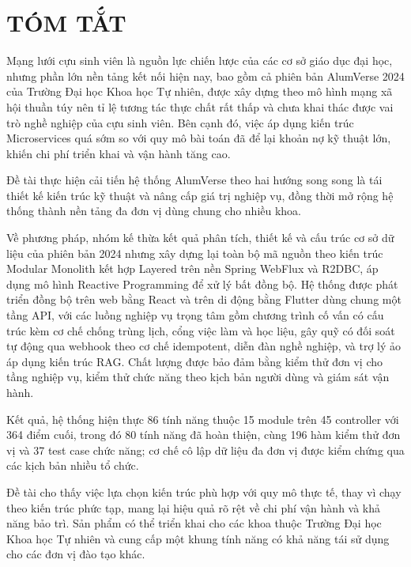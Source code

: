 \documentclass[12pt,a4paper,oneside]{report}
\begin{document}
\newpage
\chapter*{TÓM TẮT}

Mạng lưới cựu sinh viên là nguồn lực chiến lược của các cơ sở giáo dục đại học, nhưng phần lớn nền tảng kết nối hiện nay, bao gồm cả phiên bản AlumVerse 2024 của Trường Đại học Khoa học Tự nhiên, được xây dựng theo mô hình mạng xã hội thuần túy nên tỉ lệ tương tác thực chất rất thấp và chưa khai thác được vai trò nghề nghiệp của cựu sinh viên. Bên cạnh đó, việc áp dụng kiến trúc Microservices quá sớm so với quy mô bài toán đã để lại khoản nợ kỹ thuật lớn, khiến chi phí triển khai và vận hành tăng cao.

Đề tài thực hiện cải tiến hệ thống AlumVerse theo hai hướng song song là tái thiết kế kiến trúc kỹ thuật và nâng cấp giá trị nghiệp vụ, đồng thời mở rộng hệ thống thành nền tảng đa đơn vị dùng chung cho nhiều khoa.

Về phương pháp, nhóm kế thừa kết quả phân tích, thiết kế và cấu trúc cơ sở dữ liệu của phiên bản 2024 nhưng xây dựng lại toàn bộ mã nguồn theo kiến trúc Modular Monolith kết hợp Layered trên nền Spring WebFlux và R2DBC, áp dụng mô hình Reactive Programming để xử lý bất đồng bộ. Hệ thống được phát triển đồng bộ trên web bằng React và trên di động bằng Flutter dùng chung một tầng API, với các luồng nghiệp vụ trọng tâm gồm chương trình cố vấn có cấu trúc kèm cơ chế chống trùng lịch, cổng việc làm và học liệu, gây quỹ có đối soát tự động qua webhook theo cơ chế idempotent, diễn đàn nghề nghiệp, và trợ lý ảo áp dụng kiến trúc RAG. Chất lượng được bảo đảm bằng kiểm thử đơn vị cho tầng nghiệp vụ, kiểm thử chức năng theo kịch bản người dùng và giám sát vận hành.

Kết quả, hệ thống hiện thực 86 tính năng thuộc 15 module trên 45 controller với 364 điểm cuối, trong đó 80 tính năng đã hoàn thiện, cùng 196 hàm kiểm thử đơn vị và 37 test case chức năng; cơ chế cô lập dữ liệu đa đơn vị được kiểm chứng qua các kịch bản nhiều tổ chức.

Đề tài cho thấy việc lựa chọn kiến trúc phù hợp với quy mô thực tế, thay vì chạy theo kiến trúc phức tạp, mang lại hiệu quả rõ rệt về chi phí vận hành và khả năng bảo trì. Sản phẩm có thể triển khai cho các khoa thuộc Trường Đại học Khoa học Tự nhiên và cung cấp một khung tính năng có khả năng tái sử dụng cho các đơn vị đào tạo khác.

\newpage
{}
\setcounter{page}{1}
\end{document}
